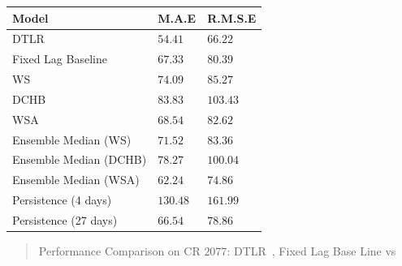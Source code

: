 \documentclass[portrait,a0,final]{a0poster}
\newcommand{\mytablecaption}[1]{
  \vspace{0.5cm}
  \begin{center}
    \begin{quote}
        {#1}
    \end{quote}    
  \end{center}
  \vspace{1cm}
  \stepcounter{table}
}
\def\XX{{DTLR}}
\newenvironment{poster}{
  \begin{center}
  \begin{minipage}[c]{0.95\textwidth}
}{
  \end{minipage} 
  \end{center}
}
\begin{document}
\begin{poster}
\begin{multicols}{2}
\begin{center}
  \label{tab:results_reiss}
  \centering
  \begin{tabular}{ l l l }
  \hline
  Model &  M.A.E & R.M.S.E \\
  \hline
  \XX & $54.41$ & $66.22$ \\
  Fixed Lag Baseline & $67.33$ & $80.39$ \\
  WS & $74.09$ & $85.27$ \\
  DCHB & $83.83$ & $103.43$ \\
  WSA & $68.54$ & $82.62$ \\
  Ensemble Median (WS)   & $71.52$ & $83.36$ \\
  Ensemble Median (DCHB) & $78.27$ & $100.04$ \\
  Ensemble Median (WSA)  & $62.24$ & $74.86$ \\
  Persistence (4 days)   & $130.48$ & $161.99$ \\
  Persistence (27 days)  & $66.54$ & $78.86$ \\
  \hline
  \end{tabular}
  \mytablecaption{
    Performance Comparison on CR $2077$: \XX \ , 
    Fixed Lag Base Line vs \citet{Reiss_2019}
  }
\end{center}






\end{multicols}

\end{poster}
\end{document}
